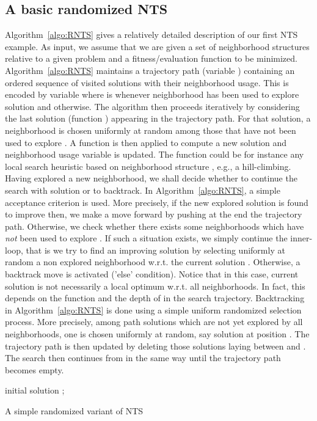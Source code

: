 \documentclass{acm_proc_article-sp}
\begin{document}
\subsection{A basic randomized NTS}
Algorithm~\ref{algo:RNTS} gives a relatively detailed description of our first NTS example. As input, we assume that we are given a set of  neighborhood structures  relative to a given problem and a fitness/evaluation function  to be minimized. Algorithm~\ref{algo:RNTS} maintains a trajectory path (variable ) containing an ordered sequence of visited solutions with their neighborhood usage. This is encoded by variable  where  is  whenever neighborhood  has been used to explore solution  and  otherwise. The algorithm then proceeds iteratively by considering the last solution  (function ) appearing in the trajectory path. For that solution, a neighborhood  is chosen uniformly at random among those that have not been used to explore . A  function is then applied to compute a new solution  and neighborhood usage variable  is updated. The  function could be for instance any local search heuristic based on neighborhood structure , e.g., a hill-climbing. Having explored a new neighborhood, we shall decide whether to continue the search with solution  or to backtrack. In Algorithm~\ref{algo:RNTS}, a simple acceptance criterion is used. More precisely, if the new explored solution  is found to improve  then, we make a move forward by pushing  at the end the trajectory path. Otherwise, we check whether there exists some neighborhoods which have \emph{not} been used to explore . If such a situation exists, we simply continue the inner-loop, that is we try to find an improving solution by selecting uniformly at random a non explored neighborhood w.r.t. the current solution . Otherwise, a backtrack move is activated ('else' condition). Notice that in this case, current solution  is not necessarily a local optimum w.r.t. all neighborhoods. In fact, this depends on the  function and the depth of  in the search trajectory. Backtracking in Algorithm~\ref{algo:RNTS} is done using a simple uniform randomized selection process. More precisely, among path solutions which are not yet explored by all neighborhoods, one is chosen uniformly at random, say solution  at position . The trajectory path is then updated by deleting those solutions laying between  and . The search then continues from  in the same way until the trajectory path becomes empty.

\begin{algorithm}
 initial solution \;
 ;
 \;
 
\caption{A simple randomized variant of NTS}
\label{algo:RNTS}
\end{algorithm}
\end{document}
